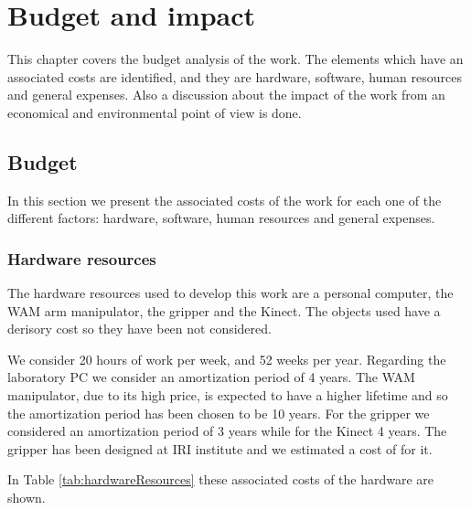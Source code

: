\chapter{Budget and impact}
\label{ch:budget}
This chapter covers the budget analysis of the work. The elements which have an associated costs are identified, and they are hardware, software, human resources and general expenses. Also a discussion about the impact of the work from an economical and environmental point of view is done. 

\section{Budget}
In this section we present the associated costs of the work for each one of the different factors: hardware, software, human resources and general expenses.

\subsection*{Hardware resources}
The hardware resources used to develop this work are a personal computer, the WAM arm manipulator, the gripper and the Kinect. The objects used have a derisory cost so they have been not considered. 

We consider 20 hours of work per week, and 52 weeks per year.
Regarding the laboratory PC we consider an amortization period of 4 years. The WAM manipulator, due to its high price, is expected to have a higher lifetime and so the amortization period has been chosen to be 10 years. For the gripper we considered an amortization period of 3 years while for the Kinect 4 years. The gripper has been designed at IRI institute and we estimated a cost of  for it.

In Table \ref{tab:hardwareResources} these associated costs of the hardware are shown. 


